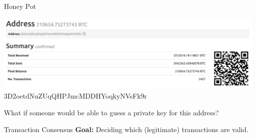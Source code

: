 \documentclass[]{beamer}
\begin{document}
\begin{frame}{Honey Pot}

\begin{center}
\includegraphics[width = 10 cm, frame]{../assets/images/honeypot}
3D2oetdNuZUqQHPJmcMDDHYoqkyNVsFk9r \\
\end{center}
\vspace{1em}
What if someone would be able to guess a private  key for this address?

\end{frame}



\begin{frame}{Transaction Consensus}
\textbf{Goal: }Deciding which (legitimate) transactions are valid. \\
\vspace{1em}
\end{frame}
\end{document}
